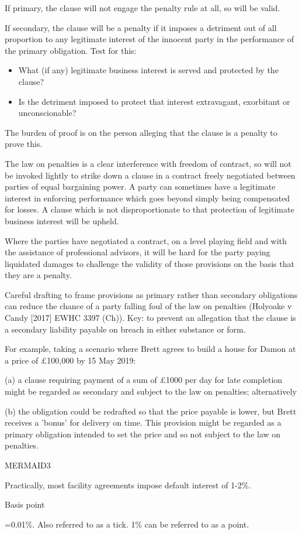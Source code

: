 \documentclass[
]{article}
\providecommand{\tightlist}{%
  \setlength{\itemsep}{0pt}\setlength{\parskip}{0pt}}
\newenvironment{env-7c6b66cc-f079-42aa-b2e4-4e0400858143}
{
    \savenotes\tcolorbox[blanker,breakable,left=5pt,borderline west={2pt}{-4pt}{gold}]
}
{
    \endtcolorbox\spewnotes
}
\begin{document}
If primary, the clause will not engage the penalty rule at all, so will
be valid.

If secondary, the clause will be a penalty if it imposes a detriment out
of all proportion to any legitimate interest of the innocent party in
the performance of the primary obligation. Test for this:

\begin{itemize}
\tightlist
\item
  What (if any) legitimate business interest is served and protected by
  the clause?
\item
  Is the detriment imposed to protect that interest extravagant,
  exorbitant or unconscionable?
\end{itemize}

The burden of proof is on the person alleging that the clause is a
penalty to prove this.

The law on penalties is a clear interference with freedom of contract,
so will not be invoked lightly to strike down a clause in a contract
freely negotiated between parties of equal bargaining power. A party can
sometimes have a legitimate interest in enforcing performance which goes
beyond simply being compensated for losses. A clause which is not
disproportionate to that protection of legitimate business interest will
be upheld.

Where the parties have negotiated a contract, on a level playing field
and with the assistance of professional advisors, it will be hard for
the party paying liquidated damages to challenge the validity of those
provisions on the basis that they are a penalty.

Careful drafting to frame provisions as primary rather than secondary
obligations can reduce the chance of a party falling foul of the law on
penalties (Holyoake v Candy {[}2017{]} EWHC 3397 (Ch)). Key: to prevent
an allegation that the clause is a secondary liability payable on breach
in either substance or form.

For example, taking a scenario where Brett agrees to build a house for
Damon at a price of £100,000 by 15 May 2019:

(a) a clause requiring payment of a sum of £1000 per day for late
completion might be regarded as secondary and subject to the law on
penalties; alternatively

(b) the obligation could be redrafted so that the price payable is
lower, but Brett receives a 'bonus' for delivery on time. This provision
might be regarded as a primary obligation intended to set the price and
so not subject to the law on penalties.

MERMAID3

Practically, most facility agreements impose default interest of 1-2\%.

\begin{env-7c6b66cc-f079-42aa-b2e4-4e0400858143}

Basis point

=0.01\%. Also referred to as a tick. 1\% can be referred to as a point.

\end{env-7c6b66cc-f079-42aa-b2e4-4e0400858143}
\end{document}
